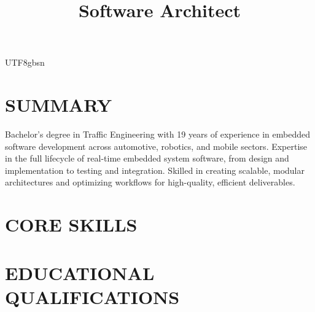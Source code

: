 \documentclass[10pt,a4paper,mono,final]{moderncv}   %
\title{Software Architect}                      %
\begin{document}
\ifxetexorluatex
\else
  \begin{CJK*}{UTF8}{gbsn}                          %
  \fi


  \makecvtitle


  \section{SUMMARY}
Bachelor's degree in Traffic Engineering with 19 years of experience in embedded software development across automotive, robotics, and mobile sectors. Expertise in the full lifecycle of real-time embedded system software, from design and implementation to testing and integration.  Skilled in creating scalable, modular architectures and optimizing workflows for high-quality, efficient deliverables.
  \section{CORE SKILLS}

  \section{EDUCATIONAL QUALIFICATIONS}





\end{CJK*}
\end{document}
